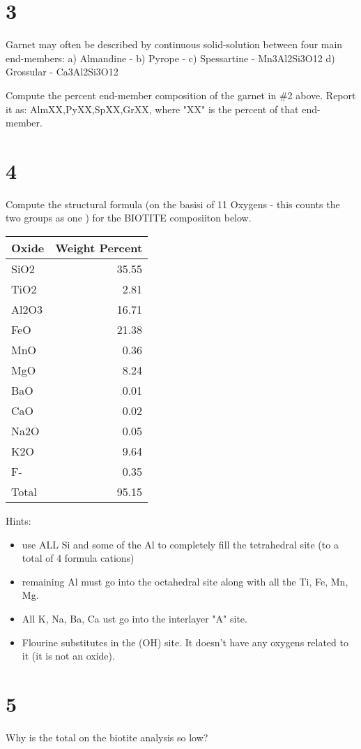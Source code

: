 \documentclass[11pt]{article}
\begin{document}
\section{3}
\label{sec-3}
Garnet may often be described by continuous solid-solution between four main end-members:
a) Almandine - 
b) Pyrope - 
c) Spessartine - Mn3Al2Si3O12
d) Grossular - Ca3Al2Si3O12

Compute the percent end-member composition of the garnet in \#2 above. Report it as:
AlmXX,PyXX,SpXX,GrXX, where "XX" is the percent of that end-member.

\section{4}
\label{sec-4}
Compute the structural formula (on the basisi of 11 Oxygens - this counts the two  groups as one ) for the BIOTITE composiiton below.
\begin{center}
\begin{tabular}{lr}
\hline
Oxide & Weight Percent\\
\hline
SiO2 & 35.55\\
TiO2 & 2.81\\
Al2O3 & 16.71\\
FeO & 21.38\\
MnO & 0.36\\
MgO & 8.24\\
BaO & 0.01\\
CaO & 0.02\\
Na2O & 0.05\\
K2O & 9.64\\
F- & 0.35\\
Total & 95.15\\
\hline
\end{tabular}
\end{center}

Hints:

\begin{itemize}
\item use ALL Si and some of the Al to completely fill the tetrahedral site (to a total of 4 formula cations)
\item remaining Al must go into the octahedral site along with all the Ti, Fe, Mn, Mg.
\item All K, Na, Ba, Ca ust go into the interlayer "A" site.
\item Flourine substitutes in the (OH) site. It doesn't have any oxygens related to it (it is not an oxide).
\end{itemize}

\section{5}
\label{sec-5}
Why is the total on the biotite analysis so low?
\end{document}
